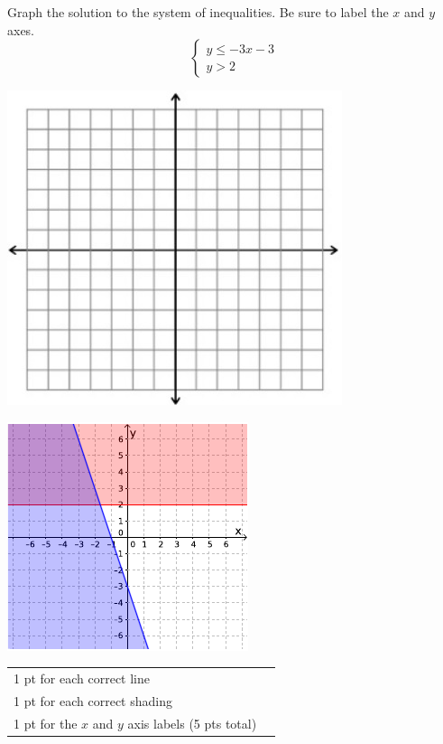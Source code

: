 

{
	Graph the solution to the system of inequalities. Be sure to label the $x$ and $y$ axes. $$\begin{cases}y\leq -3x-3 \\ y>2 \end{cases}$$\begin{onlyproblem}\begin{center}\includegraphics{fig-graphpaper.png}\end{center}\end{onlyproblem} \begin{onlysolution}\begin{center}\includegraphics{fig095-12-5-b-answer}\end{center}\end{onlysolution}
	
}
{
	\begin{tabular}{l r}
	1 pt for each correct line\\
	1 pt for each correct shading\\
	1 pt for the $x$ and $y$ axis labels (5 pts total)\\
	\end{tabular}
}
